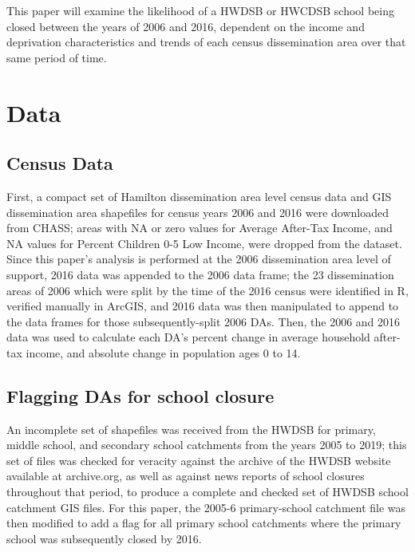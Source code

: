 \documentclass[]{elsarticle} %
\begin{document}
This paper will examine the likelihood of a HWDSB or HWCDSB school being
closed between the years of 2006 and 2016, dependent on the income and
deprivation characteristics and trends of each census dissemination area
over that same period of time.

\hypertarget{data}{%
\section{Data}\label{data}}

\hypertarget{census-data}{%
\subsection{Census Data}\label{census-data}}

First, a compact set of Hamilton dissemination area level census data
and GIS dissemination area shapefiles for census years 2006 and 2016
were downloaded from CHASS; areas with NA or zero values for Average
After-Tax Income, and NA values for Percent Children 0-5 Low Income,
were dropped from the dataset. Since this paper's analysis is performed
at the 2006 dissemination area level of support, 2016 data was appended
to the 2006 data frame; the 23 dissemination areas of 2006 which were
split by the time of the 2016 census were identified in R, verified
manually in ArcGIS, and 2016 data was then manipulated to append to the
data frames for those subsequently-split 2006 DAs. Then, the 2006 and
2016 data was used to calculate each DA's percent change in average
household after-tax income, and absolute change in population ages 0 to
14.

\hypertarget{flagging-das-for-school-closure}{%
\subsection{Flagging DAs for school
closure}\label{flagging-das-for-school-closure}}

An incomplete set of shapefiles was received from the HWDSB for primary,
middle school, and secondary school catchments from the years 2005 to
2019; this set of files was checked for veracity against the archive of
the HWDSB website available at archive.org, as well as against news
reports of school closures throughout that period, to produce a complete
and checked set of HWDSB school catchment GIS files. For this paper, the
2005-6 primary-school catchment file was then modified to add a flag for
all primary school catchments where the primary school was subsequently
closed by 2016.
\end{document}
